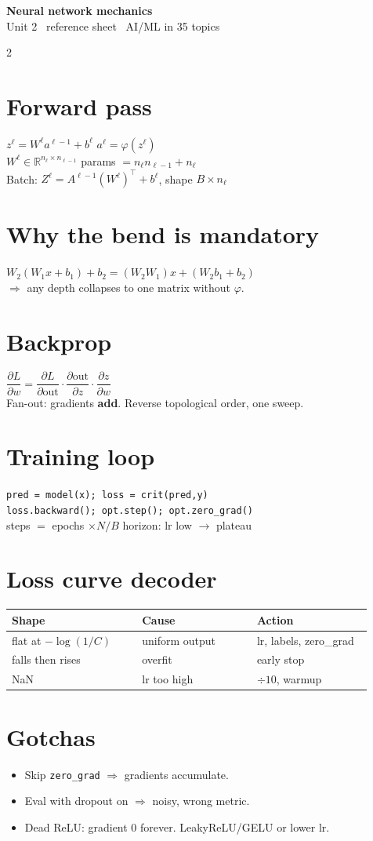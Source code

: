 \documentclass[11pt,a4paper]{article}
\newcommand{\sect}[1]{\section*{#1}}
\newcommand{\hd}[2]{\begin{center}{\large\bfseries #1}\\[-0.1em]{\small\color{gray}#2}\end{center}\vspace{-0.6em}}
\begin{document}
\hd{Neural network mechanics}{Unit 2 \textperiodcentered\ reference sheet \textperiodcentered\ AI/ML in 35 topics}
\begin{multicols}{2}
\normalsize

\sect{Forward pass}
$z^\ell=W^\ell a^{\ell-1}+b^\ell$ \quad $a^\ell=\varphi(z^\ell)$\\
$W^\ell\in\mathbb{R}^{n_\ell\times n_{\ell-1}}$ \quad params $=n_\ell n_{\ell-1}+n_\ell$\\
Batch: $Z^\ell=A^{\ell-1}(W^\ell)^\top+b^\ell$, shape $B\times n_\ell$

\sect{Why the bend is mandatory}
$W_2(W_1x+b_1)+b_2=(W_2W_1)x+(W_2b_1+b_2)$\\
$\Rightarrow$ any depth collapses to one matrix without $\varphi$.

\sect{Backprop}
$\dfrac{\partial L}{\partial w}=\dfrac{\partial L}{\partial \text{out}}\cdot\dfrac{\partial \text{out}}{\partial z}\cdot\dfrac{\partial z}{\partial w}$\\
Fan-out: gradients \textbf{add}. Reverse topological order, one sweep.

\sect{Training loop}
\texttt{pred = model(x); loss = crit(pred,y)}\\
\texttt{loss.backward(); opt.step(); opt.zero\_grad()}\\
steps $=$ epochs $\times N/B$ \quad horizon: lr low $\to$ plateau

\sect{Loss curve decoder}
\begin{tabular}{@{}p{0.34\linewidth}p{0.30\linewidth}p{0.30\linewidth}@{}}
\toprule
Shape & Cause & Action\\
\midrule
flat at $-\log(1/C)$ & uniform output & lr, labels, zero\_grad\\
falls then rises & overfit & early stop\\
NaN & lr too high & $\div 10$, warmup\\
\bottomrule
\end{tabular}

\sect{Gotchas}
\begin{itemize}
\item Skip \texttt{zero\_grad} $\Rightarrow$ gradients accumulate.
\item Eval with dropout on $\Rightarrow$ noisy, wrong metric.
\item Dead ReLU: gradient 0 forever. LeakyReLU/GELU or lower lr.
\end{itemize}


\end{multicols}
\end{document}

